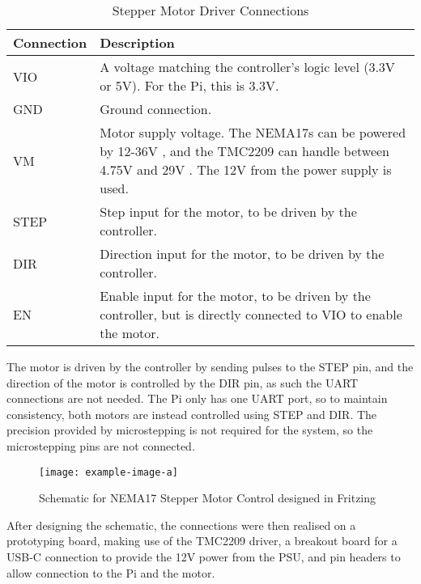 \begin{table}[H]
    \centering
    {\fontsize{10pt}{12pt}\selectfont
    \begin{tabularx}{\textwidth}{|p{3cm}|X|}
        \hline
        \textbf{Connection} & \textbf{Description} \\
        \hline
        VIO & A voltage matching the controller's logic level (3.3V or 5V). For the Pi, this is 3.3V. \\
        \hline
        GND & Ground connection. \\
        \hline
        VM & Motor supply voltage. The NEMA17s can be powered by 12-36V \cite{nema17}, and the TMC2209 can handle between 4.75V and 29V \cite{tmc2209}. The 12V from the power supply is used. \\
        \hline
        STEP & Step input for the motor, to be driven by the controller. \\
        \hline
        DIR & Direction input for the motor, to be driven by the controller. \\
        \hline
        EN & Enable input for the motor, to be driven by the controller, but is directly connected to VIO to enable the motor. \\
        \hline
    \end{tabularx}
    }
    \caption{Stepper Motor Driver Connections}
    \label{tab:stepper-motor-driver-connections}
\end{table}

The motor is driven by the controller by sending pulses to the STEP pin, and the direction of the motor is controlled by the DIR pin, as such the UART connections are not needed. The Pi only has one UART port, so to maintain consistency, both motors are instead controlled using STEP and DIR. The precision provided by microstepping is not required for the system, so the microstepping pins are not connected.

\begin{figure}[H]
    \hfill
    \begin{minipage}[t]{\textwidth}
      \centering
      \texttt{[image: example-image-a]}
      \caption{Schematic for NEMA17 Stepper Motor Control designed in Fritzing \cite{fritzing}}
    \end{minipage}
\end{figure}

After designing the schematic, the connections were then realised on a prototyping board, making use of the TMC2209 driver, a breakout board for a USB-C connection to provide the 12V power from the PSU, and pin headers to allow connection to the Pi and the motor.

